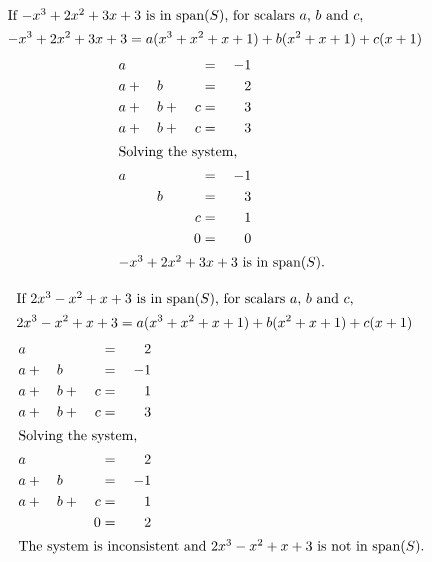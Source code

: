 \documentclass[12pt]{article}
\newenvironment{problem}[2][Problem]{\begin{trivlist}
\item[\hskip \labelsep {\bfseries #1}\hskip \labelsep {\bfseries #2.}]}{\end{trivlist}}
\begin{document}
\begin{problem}{5.e}
\end{problem}
\begin{align*}
\intertext{If $-x^3+2x^2+3x+3$ is in span($S$), for scalars $a$, $b$ and $c$,}
-x^3+2x^2+3x+3 &= a(x^3+x^2+x+1) + b(x^2+x+1) + c(x+1) 
\end{align*}
\begin{alignat*}{4}
 a&     & &     & &{}={}& -1\\
 a&{}+{}&b&     & &{}={}& 2\\
 a&{}+{}&b&{}+{}&c&{}={}& 3\\
 a&{}+{}&b&{}+{}&c&{}={}& 3\\
\shortintertext{Solving the system,}
 a&     & &     & &{}={}& -1\\
  &     &b&     & &{}={}& 3\\
  &     & &     &c&{}={}& 1\\
  &     & &     &0&{}={}& 0\\
\intertext{$-x^3+2x^2+3x+3$ is in span($S$).}
\end{alignat*}
\filbreak

\begin{problem}{5.f}
\end{problem}
\begin{align*}
\intertext{If $2x^3-x^2+x+3$ is in span($S$), for scalars $a$, $b$ and $c$,}
2x^3-x^2+x+3 &= a(x^3+x^2+x+1) + b(x^2+x+1) + c(x+1) 
\end{align*}
\begin{alignat*}{4}
 a&     & &     & &{}={}& 2\\
 a&{}+{}&b&     & &{}={}& -1\\
 a&{}+{}&b&{}+{}&c&{}={}& 1\\
 a&{}+{}&b&{}+{}&c&{}={}& 3\\
\shortintertext{Solving the system,}
 a&     & &     & &{}={}& 2\\
 a&{}+{}&b&     & &{}={}& -1\\
 a&{}+{}&b&{}+{}&c&{}={}& 1\\
  &     & &     &0&{}={}& 2\\
\intertext{The system is inconsistent and $2x^3-x^2+x+3$ is not in span($S$).}
\end{alignat*}
\filbreak
\end{document}
